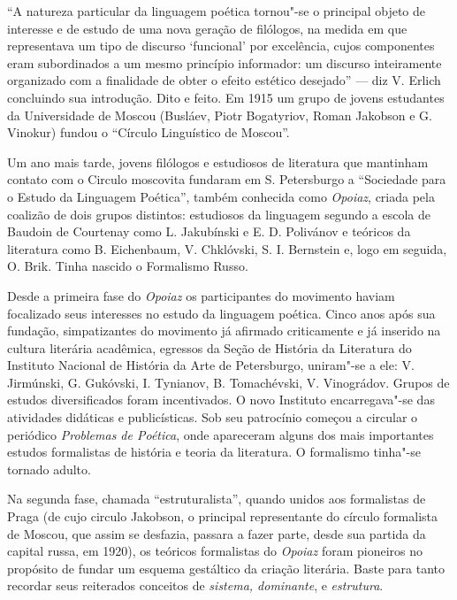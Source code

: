 {``A natureza particular da linguagem poética tornou"-se o principal
objeto de interesse e de estudo de uma nova geração de filólogos, na
medida em que representava um tipo de discurso `funcional' por
excelência, cujos componentes eram subordinados a um mesmo princípio
informador: um discurso inteiramente organizado com a finalidade de
obter o efeito estético desejado'' --- diz V. Erlich concluindo sua
introdução. Dito e feito. Em 1915 um grupo de jovens estudantes da
Universidade de Moscou (Busláev, Piotr Bogatyriov, Roman Jakobson e G.
Vinokur) fundou o ``Círculo Linguístico de Moscou''.

Um ano mais tarde, jovens filólogos e estudiosos de literatura que
mantinham contato com o Circulo moscovita fundaram em S. Petersburgo a
``Sociedade para o Estudo da Linguagem Poética'', também conhecida como
\emph{Opoiaz}, criada pela coalizão de dois grupos distintos: estudiosos
da linguagem segundo a escola de Baudoin de Courtenay como L. Jakubínski
e E. D. Polivánov e teóricos da literatura como B. Eichenbaum, V.
Chklóvski, S. I. Bernstein e, logo em seguida, O. Brik. Tinha
nascido o Formalismo Russo.

Desde a primeira fase do \emph{Opoiaz} os participantes do movimento
haviam focalizado seus interesses no estudo da linguagem poética. Cinco
anos após sua fundação, simpatizantes do movimento já afirmado
criticamente e já inserido na cultura literária acadêmica, egressos da
Seção de História da Literatura do Instituto Nacional de História da
Arte de Petersburgo, uniram"-se a ele: V. Jirmúnski, G. Gukóvski, I.
Tynianov, B. Tomachévski, V. Vinográdov. Grupos de estudos
diversificados foram incentivados. O novo Instituto encarregava"-se das
atividades didáticas e publicísticas. Sob seu patrocínio começou a
circular o periódico \emph{Problemas de Poética}, onde apareceram alguns
dos mais importantes estudos formalistas de história e teoria da
literatura. O formalismo tinha"-se tornado adulto.

Na segunda fase, chamada ``estruturalista'', quando unidos aos
formalistas de Praga (de cujo circulo Jakobson, o principal
representante do círculo formalista de Moscou, que assim se desfazia,
passara a fazer parte, desde sua partida da capital russa, em 1920), os
teóricos formalistas do \emph{Opoiaz} foram pioneiros no propósito de
fundar um esquema gestáltico da criação literária. Baste para tanto
recordar seus reiterados conceitos de \emph{sistema, dominante}, e
\emph{estrutura}.

}
